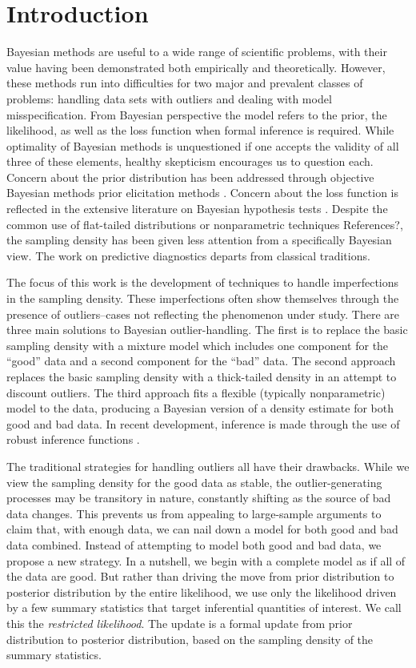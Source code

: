 \documentclass[11pt]{article}
\newcommand{\red}[1]{{\color{red}#1}}
\begin{document}
\section{Introduction}
Bayesian methods are useful to a wide range of scientific problems, with their value
having been demonstrated both empirically and theoretically. However, these methods run into difficulties
for two major and prevalent classes of problems: handling data sets
with outliers and dealing with model misspecification. From Bayesian perspective the model refers to the prior, the likelihood, as well as the loss function when formal inference is required. While optimality of Bayesian methods is unquestioned if one accepts the validity of all three of these elements, healthy skepticism encourages us to question each.  Concern about the prior distribution has
been addressed through objective Bayesian methods \citep{berger2006} prior elicitation methods \citep{garthwaite2005, ohagan2006}. Concern about the loss function is reflected in the extensive literature on Bayesian hypothesis tests \citep{kass1995}.  Despite the common use of flat-tailed distributions \citep{berger1994} or nonparametric techniques \red{References?}, the sampling density has been given less attention from a specifically Bayesian view. The work on predictive diagnostics \citep{box1980} departs from classical
traditions.  

The focus of this work is the development of techniques to handle imperfections in the sampling density.  These imperfections often show
themselves through the presence of outliers--cases not reflecting the phenomenon under
study. There are three main solutions to Bayesian outlier-handling.  The first is to replace the basic sampling
density with a mixture model which includes one component for the ``good'' data and a second 
component for the ``bad'' data.  The second approach replaces the
basic sampling density with a thick-tailed density in an attempt to discount outliers.  The third approach fits a flexible (typically nonparametric) model to the data, producing a Bayesian version of a density estimate for both good and bad data.  In recent 
development, inference is made through the use of robust inference functions \citep[][in press]{lee2013}.  

The traditional strategies for handling outliers all have their drawbacks.  While we view the sampling 
density for the good data as stable, the outlier-generating processes 
may be transitory in nature, constantly shifting as the source of bad data changes.  This prevents
us from appealing to large-sample arguments to claim that, with enough data, we can nail down a
model for both good and bad data combined.  Instead of attempting to model both good and bad
data, we propose a new strategy. In a nutshell, we begin with a complete model   
as if all of the data are good. But rather than driving the move from prior distribution to posterior
distribution by the entire likelihood, we use only the likelihood driven by a
few summary statistics that target inferential quantities
of interest.  We call this the \textit{restricted likelihood}. The update is a formal update from prior distribution to posterior distribution, based on the sampling density of the summary statistics. 
\end{document}
